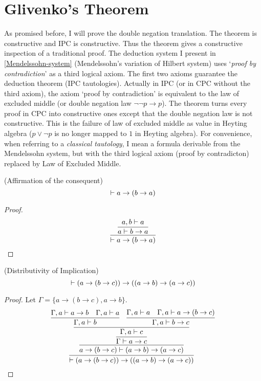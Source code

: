 \section{Glivenko's Theorem}
As promised before, I will prove the double negation translation.
The theorem is constructive and IPC is constructive. Thus the
theorem gives a constructive inspection of a traditional proof.
The deduction system I present in \autoref{Mendelssohn-system} 
(Mendelssohn's variation of Hilbert system) uses
`{\it proof by contradiction}' as a third logical axiom. The first
two axioms guarantee the deduction theorem (IPC tautologies).
Actually in IPC (or in CPC without the third axiom), 
the axiom `proof by contradiction' is equivalent to the law of
excluded middle (or double negation law $\neg\neg p\to p$). The
theorem turns every proof in CPC into constructive ones except
that the double negation law is not constructive. This is the failure
of law of excluded middle as value in Heyting algebra ($p\vee\neg p$
is no longer mapped to $1$ in Heyting algebra). For convenience,
when referring to a {\it classical tautology}, I mean a formula
derivable from the Mendelssohn system, but with the third logical
axiom (proof by contradicton) replaced by Law of Excluded Middle. 

\begin{lemma}
    (Affirmation of the consequent)
    $$
    \vdash a\to(b\to a)
    $$
\end{lemma}
\begin{proof}
    $$
    \infer{\proves a\to(b\to a)}{\infer{
        a\proves b\to a
    }{a,b\proves a}}
    $$
\end{proof}

\begin{lemma}
    (Distributivity of Implication)
    $$
    \vdash (a\to(b\to c))\to ((a\to b)\to (a\to c))
    $$
\end{lemma}
\begin{proof}
    Let $\Gamma=\{a\to(b\to c), a\to b\}$.
    $$
    \infer{\proves (a\to(b\to c))\to((a\to b)\to (a\to c))}{
        \infer{a\to(b\to c)\proves (a\to b)\to (a\to c)}{
            \infer{\Gamma\proves a\to c}{\infer{\Gamma,a\proves c}{
                \infer{\Gamma,a\proves b}{
                    \Gamma,a\proves a\to b & \Gamma,a\proves a
                }
                &
                \infer{\Gamma,a\proves b\to c}{
                    \Gamma,a\proves a & \Gamma,a\proves a\to(b\to c)
                }
            }}
        }
    }
    $$
\end{proof}

